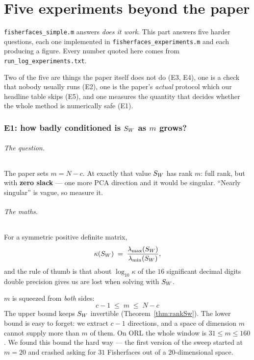 
\part{Five experiments beyond the paper}
\label{part:experiments}

\texttt{fisherfaces\_simple.m} answers \emph{does it work}. This part answers
five harder questions, each one implemented in
\texttt{fisherfaces\_experiments.m} and each producing a figure. Every number
quoted here comes from \texttt{run\_log\_experiments.txt}.

Two of the five are things the paper itself does not do (E3, E4), one is a
check that nobody usually runs (E2), one is the paper's \emph{actual} protocol
which our headline table skips (E5), and one measures the quantity that decides
whether the whole method is numerically safe (E1).

\section{E1: how badly conditioned is \texorpdfstring{$S_W$}{S\_W} as
\texorpdfstring{$m$}{m} grows?}
\label{sec:e1}

\paragraph{The question.} The paper sets $m = N-c$. At exactly that value $S_W$
has rank $m$: full rank, but with \textbf{zero slack} --- one more PCA direction
and it would be singular. ``Nearly singular'' is vague, so measure it.

\paragraph{The maths.} For a symmetric positive definite matrix,
\[
  \kappa(S_W) \;=\; \frac{\lambda_{\max}(S_W)}{\lambda_{\min}(S_W)} ,
\]
and the rule of thumb is that about $\log_{10}\kappa$ of the $16$ significant
decimal digits double precision gives us are lost when solving with $S_W$.

$m$ is squeezed from \emph{both} sides:
\[
  \boxed{\;c-1 \;\le\; m \;\le\; N-c\;}
\]
The upper bound keeps $S_W$ invertible (Theorem~\ref{thm:rankSw}). The lower
bound is easy to forget: we extract $c-1$ directions, and a space of dimension
$m$ cannot supply more than $m$ of them. On ORL the whole window is
$31 \le m \le 160$. We found this bound the hard way --- the first version of
the sweep started at $m=20$ and crashed asking for $31$ Fisherfaces out of a
$20$-dimensional space.

